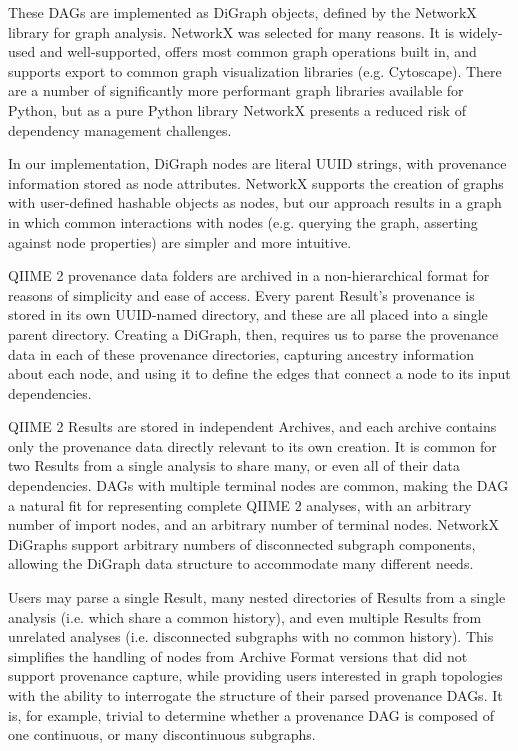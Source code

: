 These DAGs are implemented as DiGraph objects, defined by the NetworkX library
for graph analysis. NetworkX was selected for many reasons. It is widely-used
and well-supported, offers most common graph operations built in, and supports
export to common graph visualization libraries (e.g. Cytoscape). There are a
number of significantly more performant graph libraries available for Python,
but as a pure Python library NetworkX presents a reduced risk of dependency
management challenges.

In our implementation, DiGraph nodes are literal UUID strings, with provenance
information stored as node attributes. NetworkX supports the creation of graphs
with user-defined hashable objects as nodes, but our approach results in a graph
in which common interactions with nodes (e.g. querying the graph, asserting
against node properties) are simpler and more intuitive.

QIIME 2 provenance data folders are archived in a non-hierarchical format for
reasons of simplicity and ease of access. Every parent Result’s provenance is
stored in its own UUID-named directory, and these are all placed into a single
parent directory. Creating a DiGraph, then, requires us to parse the provenance
data in each of these provenance directories, capturing ancestry information
about each node, and using it to define the edges that connect a node to its
input dependencies.

QIIME 2 Results are stored in independent Archives, and each archive contains
only the provenance data directly relevant to its own creation. It is common for
two Results from a single analysis to share many, or even all of their data
dependencies. DAGs with multiple terminal nodes are common, making the DAG a
natural fit for representing complete QIIME 2 analyses, with an arbitrary number
of import nodes, and an arbitrary number of terminal nodes. NetworkX DiGraphs
support arbitrary numbers of disconnected subgraph components, allowing the
DiGraph data structure to accommodate many different needs. 

Users may parse a single Result, many nested directories of Results from a
single analysis (i.e. which share a common history), and even multiple Results
from unrelated analyses (i.e. disconnected subgraphs with no common history).
This simplifies the handling of nodes from Archive Format versions that did not
support provenance capture, while providing users interested in graph topologies
with the ability to interrogate the structure of their parsed provenance DAGs.
It is, for example, trivial to determine whether a provenance DAG is composed of
one continuous, or many discontinuous subgraphs.

